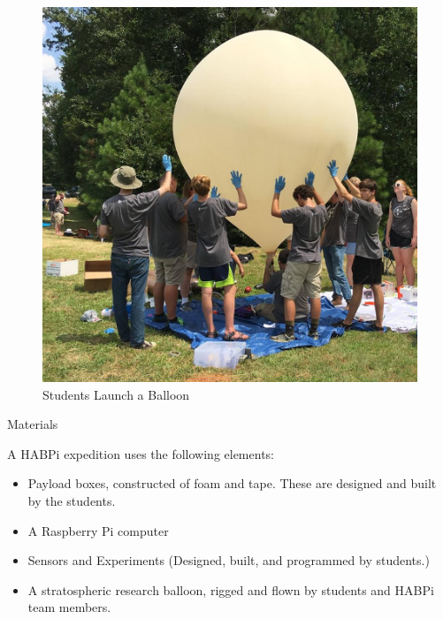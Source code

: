 \documentclass[final]{beamer}
\newlength{\onecolwid}
\newlength{\twocolwid}
\begin{document}
\begin{frame}[t]
\begin{columns}[t]
\begin{column}{\twocolwid}

\begin{columns}[t,totalwidth=\twocolwid] %

\begin{column}{\onecolwid} %

\begin{figure}
   \includegraphics[width=0.6\linewidth]{launch1}
   \caption{Students Launch a Balloon}
\end{figure}


\begin{block}{Materials}

A HABPi expedition uses the following elements:

\begin{itemize}
\item Payload boxes, constructed of foam and tape.  These are designed and built by the students.
\item A Raspberry Pi computer
\item Sensors and Experiments (Designed, built, and programmed by students.)
\item A stratospheric research balloon, rigged and flown by students and HABPi team members.
\end{itemize}



\end{block}
\end{column}
\end{columns}
\end{column}
\end{columns}
\end{frame}
\end{document}
